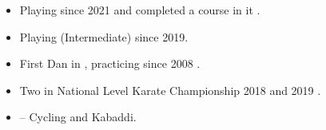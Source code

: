 \begin{itemize}

\item Playing {\color{black}{Chess}} since 2021 \hspace{0.02cm}\href{https://lichess.org/@/aaryan20004}{\color{coolblack}{\ExternalLink}} and completed a {\color{black}{Self-growth}} course in it \hspace{0.02cm}\href{https://drive.google.com/file/d/1TKWs0O4oMsfmQv2sTEXhBitCtC3n1lHn/view?usp=sharing}{\color{coolblack}{\ExternalLink}}.
\smallskip
\item Playing {\color{black}{Guitar}} (Intermediate) since 2019.
\smallskip
\item First Dan {\color{black}{Black Belt}} in {\color{black}{Karate}}, practicing since 2008 \hspace{0.02cm}\href{https://drive.google.com/file/d/1JoKezafJ_j58_FUGwm4_MW-CSWOgB9Iq/view?usp=sharing}{\color{coolblack}{\ExternalLink}}.
\smallskip
\item Two {\color{black}{Bronze Medals}} in National Level Karate Championship 2018 and 2019 \hspace{0.02cm}\href{https://drive.google.com/file/d/1JwTKwOhlYg8OSZzhLZ06Uf-Zfi4yDrQw/view?usp=sharing}{\color{coolblack}{\ExternalLink}}.
\smallskip
\item {\color{black}{Other Areas of Interest}} -- Cycling and Kabaddi.

\end{itemize}